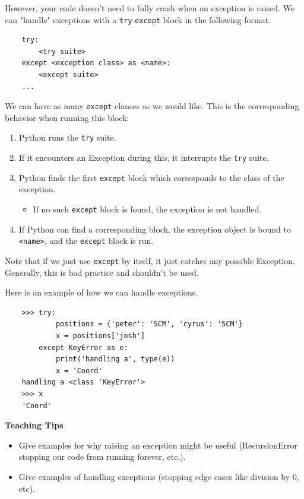 However, your code doesn't need to fully crash when an exception is raised.
We can "handle" exceptions with a \lstinline{try}-\lstinline{except} block in the following format.
\begin{lstlisting}
    try:
        <try suite>
    except <exception class> as <name>:
        <except suite>
    ...
\end{lstlisting}
We can have as many \lstinline{except} clauses as we would like. This is the corresponding behavior when running this block:

\begin{enumerate}
    \item Python runs the \lstinline{try} suite.
    \item If it encounters an Exception during this, it interrupts the \lstinline{try} suite.
    \item Python finds the first \lstinline{except} block which corresponds to the class of the exception.
        \begin{itemize}
            \item If no such \lstinline{except} block is found, the exception is not handled.
        \end{itemize}
    \item If Python can find a corresponding block, the exception object is bound to \lstinline{<name>}, and the \lstinline{except} block is run.
\end{enumerate}

Note that if we just use \lstinline{except} by itself, it just catches any possible Exception. Generally, this is bad practice and shouldn't be used.

Here is an example of how we can handle exceptions.
\begin{lstlisting}
    >>> try:
            positions = {'peter': 'SCM', 'cyrus': 'SCM'}
            x = positions['josh']
        except KeyError as e:
            print('handling a', type(e))
            x = 'Coord'
    handling a <class 'KeyError'>
    >>> x
    'Coord'
\end{lstlisting}

\begin{blocksection}
\begin{guide}
\textbf{Teaching Tips}
\begin{itemize}
    \item Give examples for why raising an exception might be useful (RecursionError stopping our code from running forever, etc.).
    \item Give examples of handling exceptions (stopping edge cases like division by 0, etc).
\end{itemize}
\end{guide}
\end{blocksection}